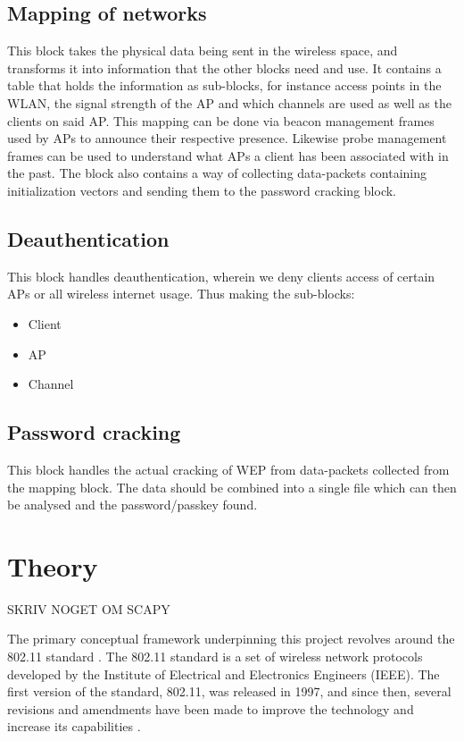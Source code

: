 \subsection{Mapping of networks}
This block takes the physical data being sent in the wireless space, and transforms it into information that the other blocks need and use. It contains a table that holds the information as sub-blocks, for instance access points in the WLAN, the signal strength of the AP and which channels are used as well as the clients on said AP. This mapping can be done via beacon management frames used by APs to announce their respective presence. Likewise probe management frames can be used to understand what APs a client has been associated with in the past.
The block also contains a way of collecting data-packets containing initialization vectors and sending them to the password cracking block. 

\newpage
\subsection{Deauthentication}
This block handles deauthentication, wherein we deny clients access of certain APs or all wireless internet usage. Thus making the sub-blocks: 
\begin{itemize}
    \item Client
    \item AP
    \item Channel
\end{itemize}


\subsection{Password cracking}
This block handles the actual cracking of WEP from data-packets collected from the mapping block. The data should be combined into a single file which can then be analysed and the password/passkey found.

\section{Theory}

SKRIV NOGET OM SCAPY

The primary conceptual framework underpinning this project revolves around the 802.11 standard \cite{IEEE802.11}. The 802.11 standard is a set of wireless network protocols developed by the Institute of Electrical and Electronics Engineers (IEEE). The first version of the standard, 802.11, was released in 1997, and since then, several revisions and amendments have been made to improve the technology and increase its capabilities \cite{ETHW}.

